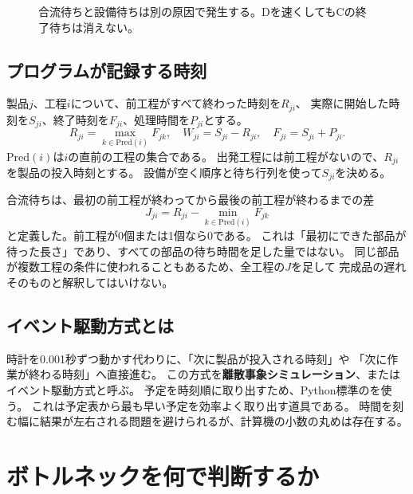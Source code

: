 \documentclass[a4paper,11pt]{ltjsarticle}
\DeclareRobustCommand{\code}[1]{\texttt{\detokenize{#1}}}
\newcommand{\term}[1]{\textbf{#1}}
\begin{document}
\begin{figure}[htbp]\centering
{}
\caption{合流待ちと設備待ちは別の原因で発生する。Dを速くしてもCの終了待ちは消えない。}
\end{figure}

\subsection{プログラムが記録する時刻}
製品$j$、工程$i$について、前工程がすべて終わった時刻を$R_{ji}$、
実際に開始した時刻を$S_{ji}$、終了時刻を$F_{ji}$、処理時間を$P_{ji}$とする。
\[
 R_{ji}=\max_{k\in\mathrm{Pred}(i)}F_{jk},\quad
 W_{ji}=S_{ji}-R_{ji},\quad
 F_{ji}=S_{ji}+P_{ji}.
\]
$\mathrm{Pred}(i)$は$i$の直前の工程の集合である。
出発工程には前工程がないので、$R_{ji}$を製品の投入時刻とする。
設備が空く順序と待ち行列を使って$S_{ji}$を決める。

合流待ちは、最初の前工程が終わってから最後の前工程が終わるまでの差
\[
 J_{ji}=R_{ji}-\min_{k\in\mathrm{Pred}(i)}F_{jk}
\]
と定義した。前工程が0個または1個なら0である。
これは「最初にできた部品が待った長さ」であり、すべての部品の待ち時間を足した量ではない。
同じ部品が複数工程の条件に使われることもあるため、全工程の$J$を足して
完成品の遅れそのものと解釈してはいけない。

\subsection{イベント駆動方式とは}
時計を0.001秒ずつ動かす代わりに、「次に製品が投入される時刻」や
「次に作業が終わる時刻」へ直接進む。
この方式を\term{離散事象シミュレーション}、またはイベント駆動方式と呼ぶ。
予定を時刻順に取り出すため、Python標準の\code{heapq}を使う\cite{heapq}。
これは予定表から最も早い予定を効率よく取り出す道具である。
時間を刻む幅に結果が左右される問題を避けられるが、計算機の小数の丸めは存在する。

\clearpage
\section{ボトルネックを何で判断するか}
\end{document}
